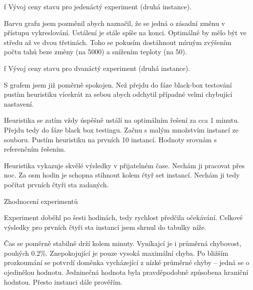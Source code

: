 \centerline{ \picwidth=14cm  }
\caption/f Vývoj ceny stavu pro jedenáctý experiment (druhá instance).
\bigskip

Barvu grafu jsem pozměnil abych naznačil, že se jedná o zásadní změnu v přístupu vykreslování. Ustálení je stále spíše na konci. Optimálně by mělo být ve středu až ve dvou třetinách. Toho se pokusím dostáhnout mírným zvýšením počtu tahů beze změny (na 5000) a snížením teploty (na 50).

\centerline{ \picwidth=15cm  }
\caption/f Vývoj ceny stavu pro dvanáctý experiment (druhá instance).
\bigskip

S grafem jsem již poměrně spokojen. Než přejdu do fáze black-box testování pustím heuristiku vícekrát za sebou abych odchytil případné velmi chybující nastavení.

\bigskip
\centerline{}\bigskip

Heuristika se zatím vždy úspěšně ustálí na optimálním řešení za cca 1 minutu. Přejdu tedy do fáze black box testingu. Začnu s malým množstvím instancí ze souboru. Pustím heuristiku na prvních 10 instancí. Hodnoty srovnám s referenčním řešením.

\bigskip
\centerline{}\bigskip

Heuristika vykazuje skvělé výsledky v přijatelném čase. Nechám ji pracovat přes noc. Za osm hodin je schopna stihnout kolem čtyř set instancí. Nechám ji tedy počítat prvních čtyři sta zadaných.

\vfill\break
\sec Zhodnocení experimentů

Experiment doběhl po šesti hodinách, tedy rychlost předčila očekávání. Celkové výsledky pro prvních čtyři sta instancí jsem shrnul do tabulky níže. 

\bigskip
\centerline{}\bigskip

Čas se poměrně stabilně drží kolem minuty. Vyníkajcí je i průměrná chybovost, pouhých 0.2\%. Znepokojující je pouze vysoká maximální chyba. Po bližším prozkoumání se potvrdí doměnka vycházející z nízké průměrné chyby -- jedná se o ojedinělou hodnotu. Jedninečná hodnota byla pravděpodobně způsobena hraniční hodntou. Přesto instanci dále prověřím.

